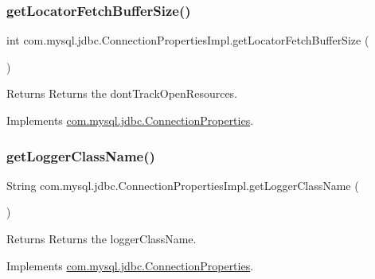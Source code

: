 \subsubsection{\texorpdfstring{get\+Locator\+Fetch\+Buffer\+Size()}{getLocatorFetchBufferSize()}}
{\footnotesize\ttfamily int com.\+mysql.\+jdbc.\+Connection\+Properties\+Impl.\+get\+Locator\+Fetch\+Buffer\+Size (\begin{DoxyParamCaption}{ }\end{DoxyParamCaption})}

\begin{DoxyReturn}{Returns}
Returns the dont\+Track\+Open\+Resources. 
\end{DoxyReturn}


Implements \mbox{\hyperlink{interfacecom_1_1mysql_1_1jdbc_1_1_connection_properties_a9e88b2b4823f85f1ce0a95b4a7b9b5d5}{com.\+mysql.\+jdbc.\+Connection\+Properties}}.

\mbox{\label{classcom_1_1mysql_1_1jdbc_1_1_connection_properties_impl_a03a1c91c39ab31c5ea5ba74bd5c29c6c}} 
\subsubsection{\texorpdfstring{get\+Logger\+Class\+Name()}{getLoggerClassName()}}
{\footnotesize\ttfamily String com.\+mysql.\+jdbc.\+Connection\+Properties\+Impl.\+get\+Logger\+Class\+Name (\begin{DoxyParamCaption}{ }\end{DoxyParamCaption})}

\begin{DoxyReturn}{Returns}
Returns the logger\+Class\+Name. 
\end{DoxyReturn}


Implements \mbox{\hyperlink{interfacecom_1_1mysql_1_1jdbc_1_1_connection_properties_aab196f0a4527adf8f56c13b2530fbd23}{com.\+mysql.\+jdbc.\+Connection\+Properties}}.

\mbox{\label{classcom_1_1mysql_1_1jdbc_1_1_connection_properties_impl_a929bdbe024042ad2fca4b5c9dc6a9fad}} 
